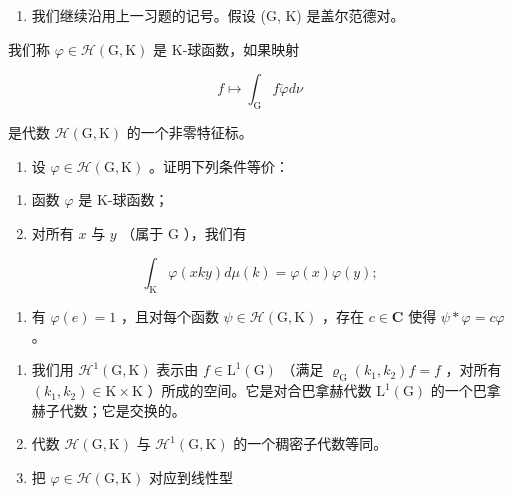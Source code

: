 \begin{enumerate}
\def\labelenumi{\arabic{enumi})}
\setcounter{enumi}{26}
\tightlist
\item
  我们继续沿用上一习题的记号。假设 (G, K) 是盖尔范德对。
\end{enumerate}

我们称 \(\varphi\in\mathcal{H}(\mathrm{G},\mathrm{K})\) 是 K-球函数，如果映射

\[
f \mapsto \int_ {\mathrm{G}} f \check {\varphi} d \nu
\]

是代数 \(\mathcal{H}(\mathrm{G},\mathrm{K})\) 的一个非零特征标。

\begin{enumerate}
\def\labelenumi{\alph{enumi})}
\tightlist
\item
  设 \(\varphi \in \mathcal{H}(\mathrm{G},\mathrm{K})\) 。证明下列条件等价：
\end{enumerate}

\begin{enumerate}
\def\labelenumi{(\roman{enumi})}
\item
  函数 \(\varphi\) 是 K-球函数；
\item
  对所有 \(x\) 与 \(y\) （属于 \(\mathrm{G}\) ），我们有
\end{enumerate}

\[
\int_ {\mathrm{K}} \varphi (x k y) d \mu (k) = \varphi (x) \varphi (y);
\]

\begin{enumerate}
\def\labelenumi{(\roman{enumi})}
\setcounter{enumi}{2}
\tightlist
\item
  有 \(\varphi(e)=1\) ，且对每个函数 \(\psi\in\mathcal{H}(\mathrm{G},\mathrm{K})\) ，存在 \(c\in\mathbf{C}\) 使得 \(\psi*\varphi=c\varphi\) 。
\end{enumerate}

\begin{enumerate}
\def\labelenumi{\alph{enumi})}
\setcounter{enumi}{1}
\item
  我们用 \(\mathcal{H}^1 (\mathrm{G},\mathrm{K})\) 表示由 \(f\in \mathrm{L}^1 (\mathrm{G})\) （满足 \(\varrho_{\mathrm{G}}(k_1,k_2)f = f\) ，对所有 \((k_{1},k_{2})\in \mathrm{K}\times \mathrm{K}\) ）所成的空间。它是对合巴拿赫代数 \(\mathrm{L}^1 (\mathrm{G})\) 的一个巴拿赫子代数；它是交换的。
\item
  代数 \(\mathcal{H}(\mathrm{G},\mathrm{K})\) 与 \(\mathcal{H}^1 (\mathrm{G},\mathrm{K})\) 的一个稠密子代数等同。\\
\item
  把 \(\varphi \in \mathcal{H}(\mathrm{G},\mathrm{K})\) 对应到线性型
\end{enumerate}


